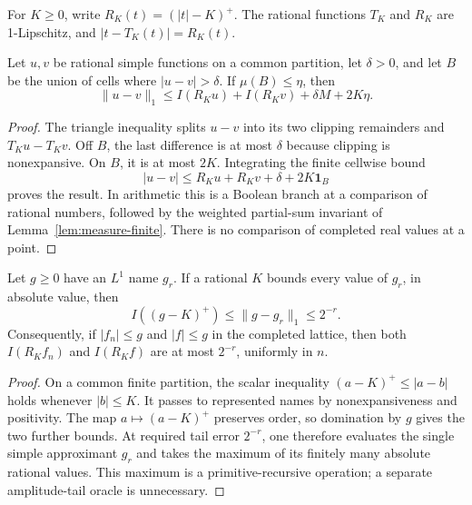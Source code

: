 For \(K\geq0\), write
\(R_K(t)=(|t|-K)^+\).  The rational functions \(T_K\) and \(R_K\) are
1-Lipschitz, and \(|t-T_K(t)|=R_K(t)\).

\begin{lemma}\label{lem:measure-vitali-finite}
Let \(u,v\) be rational simple functions on a common partition, let
\(\delta>0\), and let \(B\) be the union of cells where
\(|u-v|>\delta\).  If \(\mu(B)\leq\eta\), then
\begin{equation}
 \|u-v\|_1\leq I(R_Ku)+I(R_Kv)+\delta M+2K\eta.
 \label{eq:measure-vitali-finite}
\end{equation}
\end{lemma}

\begin{proof}
The triangle inequality splits \(u-v\) into its two clipping remainders and
\(T_Ku-T_Kv\).  Off \(B\), the last difference is at most \(\delta\)
because clipping is nonexpansive.  On \(B\), it is at most \(2K\).
Integrating the finite cellwise bound
\[
 |u-v|\leq R_Ku+R_Kv+\delta+2K\mathbf1_B
\]
proves the result.  In arithmetic this is a Boolean branch at a comparison of
rational numbers, followed by the weighted partial-sum invariant of
Lemma~\ref{lem:measure-finite}.  There is no comparison of completed real
values at a point.
\end{proof}

\begin{lemma}
\label{lem:measure-majorant-tail}
Let \(g\geq0\) have an \(L^1\) name \(g_r\).  If a rational \(K\)
bounds every value of \(g_r\), in absolute value, then
\[
 I((g-K)^+)\leq\|g-g_r\|_1\leq2^{-r}.
\]
Consequently, if \(|f_n|\leq g\) and \(|f|\leq g\) in the completed
lattice, then both \(I(R_Kf_n)\) and \(I(R_Kf)\) are at most \(2^{-r}\),
uniformly in \(n\).
\end{lemma}

\begin{proof}
On a common finite partition, the scalar inequality
\((a-K)^+\leq|a-b|\) holds whenever \(|b|\leq K\).
It passes to represented names by nonexpansiveness and positivity.
The map \(a\mapsto(a-K)^+\) preserves order, so domination by \(g\)
gives the two further bounds.  At required tail error \(2^{-r}\), one
therefore evaluates the single simple approximant \(g_r\) and takes the
maximum of its finitely many absolute rational values.  This maximum is a
primitive-recursive operation; a separate amplitude-tail oracle is unnecessary.
\end{proof}


